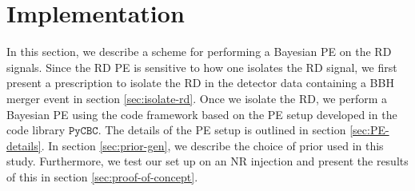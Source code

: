 \section{Implementation}
\label{sec:Implementation}

In this section, we describe a scheme for performing a Bayesian PE on the RD signals.  Since the RD PE is sensitive to how one isolates the RD signal, we first present a prescription to isolate the RD in the detector data containing a BBH merger event in section \ref{sec:isolate-rd}. Once we isolate the RD, we perform a Bayesian PE using the code framework based on the PE setup developed in the code library $\texttt{PyCBC}$. The details of the PE setup is outlined in section \ref{sec:PE-details}. In section \ref{sec:prior-gen}, we describe the choice of prior used in this study. Furthermore, we test our set up on an NR injection and present the results of this in section \ref{sec:proof-of-concept}.


